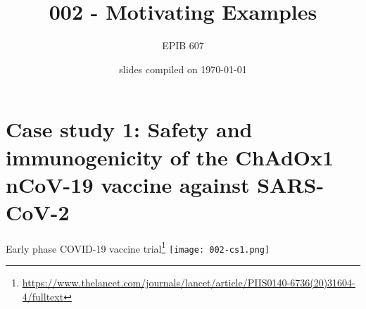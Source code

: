 \documentclass[10pt,handout]{beamer}\usepackage[]{graphicx}\usepackage[]{color}
\begin{document}
	
	
	
	
	\title{002 - Motivating Examples}
	\author{EPIB 607}
	
	\date{slides compiled on \today}
	
	\maketitle

\section{Case study 1: Safety and immunogenicity of the ChAdOx1 nCoV-19	vaccine against SARS-CoV-2}


\begin{frame}{Early phase COVID-19 vaccine trial\footnote{\tiny\url{https://www.thelancet.com/journals/lancet/article/PIIS0140-6736(20)31604-4/fulltext}}}
	\centering
	\texttt{[image: 002-cs1.png]}	
\end{frame}
\end{document}
